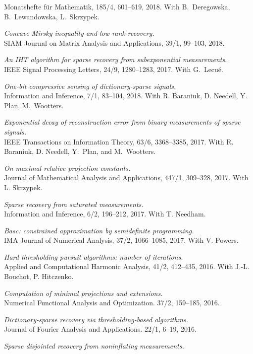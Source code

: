 \documentclass[11pt]{article}
\begin{document}
Monatshefte f\"ur Mathematik, 185/4, 601--619, 2018. With B.~Deregowska, B.~Lewandowska, L.~Skrzypek.
\item {\sl Concave Mirsky inequality and low-rank recovery.}\\
SIAM Journal on Matrix Analysis and Applications, 39/1, 99--103, 2018.
\item {\sl An IHT algorithm for sparse recovery from subexponential measurements}.\\
IEEE Signal Processing Letters, 24/9, 1280--1283, 2017. 
With G.~Lecu\'e.
\item {\sl One-bit compressive sensing of dictionary-sparse signals.}\\
Information and Inference, 7/1, 83--104, 2018.
With R. Baraniuk, D. Needell, Y. Plan, M.~Wootters.
\item {\sl Exponential decay of reconstruction error from binary measurements of sparse signals.}\\
IEEE Transactions on Information Theory, 63/6, 3368--3385, 2017.
With R. Baraniuk, D. Needell, Y.~Plan, and \mbox{M.~Wootters}.
\item {\sl On maximal relative projection constants.}\\
Journal of Mathematical Analysis and Applications,  447/1, 309--328, 2017.
With L. Skrzypek.
\item {\sl  Sparse recovery from saturated measurements.}\\
Information and Inference, 6/2, 196--212, 2017.
With T. Needham.
\item{\sl {\sf Basc}: constrained approximation by semidefinite programming.}\\
IMA Journal of Numerical Analysis, 37/2, 1066--1085, 2017.
With V. Powers.
\item {\sl Hard thresholding pursuit algorithms: number of iterations.}\\
Applied and Computational Harmonic Analysis, 
41/2, 412--435, 2016.
With J.-L. Bouchot, P. Hitczenko. 
\item {\sl Computation of minimal projections and extensions.}\\
Numerical Functional Analysis and Optimization. 37/2, 159--185, 2016.
\item {\sl Dictionary-sparse recovery via thresholding-based algorithms.}\\ 
Journal of Fourier Analysis and Applications. 22/1, 6--19, 2016.
\item {\sl Sparse disjointed recovery from noninflating measurements.}\\
\end{document}
